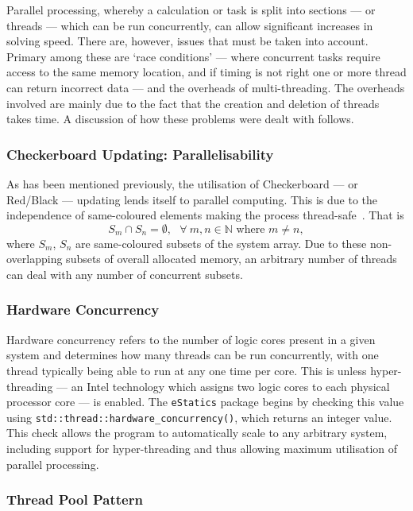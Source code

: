 	Parallel processing, whereby a calculation or task is split into sections --- or threads --- which can be run concurrently, can allow significant increases in solving speed. There are, however, issues that must be taken into account. Primary among these are `race conditions' --- where concurrent tasks require access to the same memory location, and if timing is not right one or more thread can return incorrect data --- and the overheads of multi-threading. The overheads involved are mainly due to the fact that the creation and deletion of threads takes time. A discussion of how these problems were dealt with follows.
		
		\subsubsection{Checkerboard Updating: Parallelisability}
		
		As has been mentioned previously, the utilisation of Checkerboard --- or Red/Black --- updating lends itself to parallel computing. This is due to the independence of same-coloured elements making the process thread-safe~\cite{wallach}. That is 
		\[
		S_m \cap S_n = \emptyset, \ \ \ \forall \  m, n \in \mathbb{N} \text{ where } m \neq n,
		\]
		where $S_m$, $S_n$ are same-coloured subsets of the system array. Due to these non-overlapping subsets of overall allocated memory, an arbitrary number of threads can deal with any number of concurrent subsets.
		
		\subsubsection{Hardware Concurrency}
		
			Hardware concurrency refers to the number of logic cores present in a given system and determines how many threads can be run concurrently, with one thread typically being able to run at any one time per core. This is unless hyper-threading --- an Intel technology which assigns two logic cores to each physical processor core --- is enabled. The \lstinline|eStatics| package begins by checking this value using \lstinline|std::thread::hardware_concurrency()|, which returns an integer value. This check allows the program to automatically scale to any arbitrary system, including support for hyper-threading and thus allowing maximum utilisation of parallel processing.
		
		\subsubsection{Thread Pool Pattern}
		
